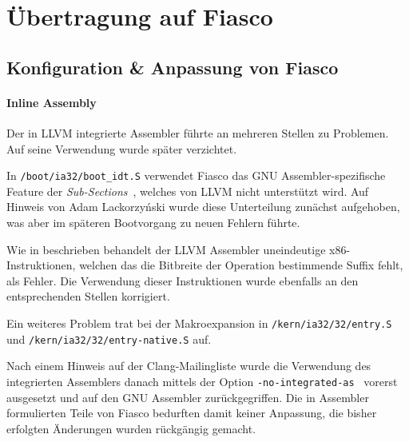\section{Übertragung auf Fiasco}

\subsection{Konfiguration \& Anpassung von Fiasco}

\paragraph{Inline Assembly}

Der in LLVM integrierte Assembler führte an mehreren Stellen zu Problemen. Auf
seine Verwendung wurde später verzichtet.

In \texttt{/boot/ia32/boot\_idt.S} verwendet Fiasco das GNU
Assembler-spezi\-fi\-sche Feature der
\emph{Sub-Sections}~\cite{gas-subsections}, welches von LLVM nicht unterstützt
wird. Auf Hinweis von Adam Lackorzyński wurde diese Unterteilung zunächst
aufgehoben, was aber im späteren Bootvorgang zu neuen Fehlern führte.

Wie in \cite[Inline assembly]{clang-compatibility} beschrieben behandelt der
LLVM Assembler uneindeutige x86-Instruktionen, welchen das die Bitbreite der
Operation bestimmende Suffix fehlt, als Fehler. Die Verwendung dieser
Instruktionen wurde ebenfalls an den entsprechenden Stellen korrigiert.

Ein weiteres Problem trat bei der Makroexpansion in
\texttt{/kern/ia32/32\-/en\-try.S} und \texttt{/kern/ia32/32\-/entry-native.S} auf.

Nach einem Hinweis auf der Clang-Mailingliste wurde die Verwendung des
integrierten Assemblers danach mittels der Option
\texttt{-no-integrated-as}~\cite{manclang} vorerst ausgesetzt und auf den GNU
Assembler zurückgegriffen. Die in Assembler formulierten Teile von Fiasco
bedurften damit keiner Anpassung, die bisher erfolgten Änderungen wurden
rückgängig gemacht.
